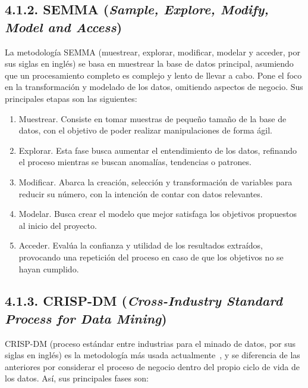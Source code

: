 \subsection{4.1.2. SEMMA (\textit{Sample, Explore, Modify, Model and Access})}

La metodología SEMMA (muestrear, explorar, modificar, modelar y acceder, por sus siglas en inglés) se basa en muestrear la base de datos principal, asumiendo que un procesamiento completo es complejo y lento de llevar a cabo. Pone el foco en la transformación y modelado de los datos, omitiendo aspectos de negocio. Sus principales etapas son las siguientes:

\begin{enumerate}
    \item Muestrear. Consiste en tomar muestras de pequeño tamaño de la base de datos, con el objetivo de poder realizar manipulaciones de forma ágil.
    \item Explorar. Esta fase busca aumentar el entendimiento de los datos, refinando el proceso mientras se buscan anomalías, tendencias o patrones.
    \item Modificar. Abarca la creación, selección y transformación de variables para reducir su número, con la intención de contar con datos relevantes.
    \item Modelar. Busca crear el modelo que mejor satisfaga los objetivos propuestos al inicio del proyecto.
    \item Acceder. Evalúa la confianza y utilidad de los resultados extraídos, provocando una repetición del proceso en caso de que los objetivos no se hayan cumplido.
\end{enumerate}


\subsection{4.1.3. CRISP-DM (\textit{Cross-Industry Standard Process for Data Mining})}

CRISP-DM (proceso estándar entre industrias para el minado de datos, por sus siglas en inglés) es la metodología más usada actualmente~\cite{crisp}, y se diferencia de las anteriores por considerar el proceso de negocio dentro del propio ciclo de vida de los datos. Así, sus principales fases son:

